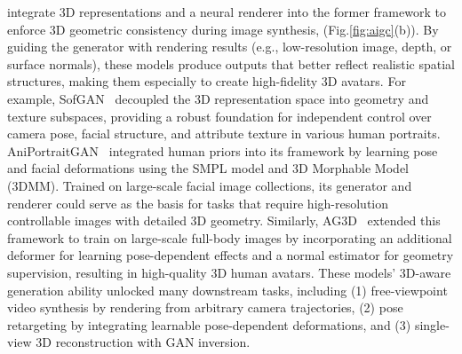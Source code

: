  integrate 3D representations and a neural renderer into the former framework to enforce 3D geometric consistency during image synthesis, (Fig.\ref{fig:aigc}(b)). By guiding the generator with rendering results (e.g., low-resolution image, depth, or surface normals), these models produce outputs that better reflect realistic spatial structures, making them especially to create high-fidelity 3D avatars. For example,
SofGAN~\cite{chen2022sofgan} decoupled the 3D representation space into geometry and texture subspaces, providing a robust foundation for independent control over camera pose, facial structure, and attribute texture in various human portraits. 
AniPortraitGAN~\cite{wu2023aniportraitgan} integrated human priors into its framework by learning pose and facial deformations using the SMPL model and 3D Morphable Model (3DMM).
Trained on large-scale facial image collections, its generator and renderer could serve as the basis for tasks that require high-resolution controllable images with detailed 3D geometry.
Similarly, AG3D~\cite{dong2023ag3d} extended this framework to train on large-scale full-body images by incorporating an additional deformer for learning pose-dependent effects and a normal estimator for geometry supervision, resulting in high-quality 3D human avatars. These models' 3D-aware generation ability unlocked many downstream tasks, including (1) free-viewpoint video synthesis by rendering from arbitrary camera trajectories, (2) pose retargeting
by integrating learnable pose-dependent deformations, and (3) single-view 3D reconstruction with GAN inversion.




